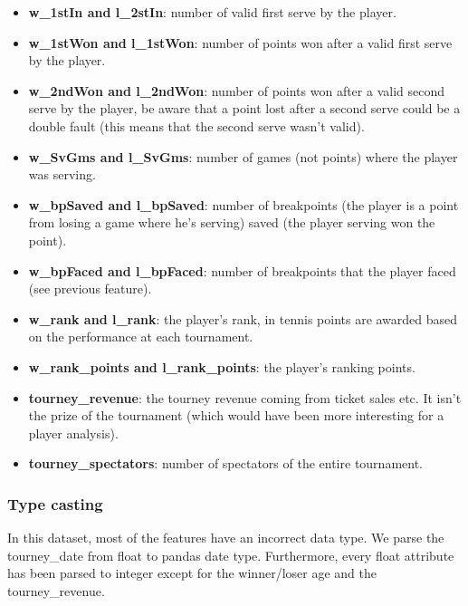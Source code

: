 \begin{itemize}
    \item \textbf{w\_1stIn and l\_2stIn}: number of valid first serve by the player.
    \item \textbf{w\_1stWon and l\_1stWon}: number of points won after a valid first serve by the player.
    \item \textbf{w\_2ndWon and l\_2ndWon}: number of points won after a valid second serve by the player, be aware that a point lost after a second serve could be a double fault (this means that the second serve wasn't valid).
    \item \textbf{w\_SvGms and l\_SvGms}: number of games (not points) where the player was serving.
    \item \textbf{w\_bpSaved and l\_bpSaved}: number of breakpoints (the player is a point from losing a game where he's serving) saved (the player serving won the point).
    \item \textbf{w\_bpFaced and l\_bpFaced}: number of breakpoints that the player faced (see previous feature).
    \item \textbf{w\_rank and l\_rank}: the player's rank, in tennis points are awarded based on the performance at each tournament.
    \item \textbf{w\_rank\_points and l\_rank\_points}: the player's ranking points.
    \item \textbf{tourney\_revenue}: the tourney revenue coming from ticket sales etc. It isn't the prize of the tournament (which would have been more interesting for a player analysis).
    \item \textbf{tourney\_spectators}: number of spectators of the entire tournament.
\end{itemize}

\subsubsection{Type casting}
In this dataset, most of the features have an incorrect data type. We parse the tourney\_date from float to pandas date type. Furthermore, every float attribute has been parsed to integer except for the winner/loser age and the tourney\_revenue.

